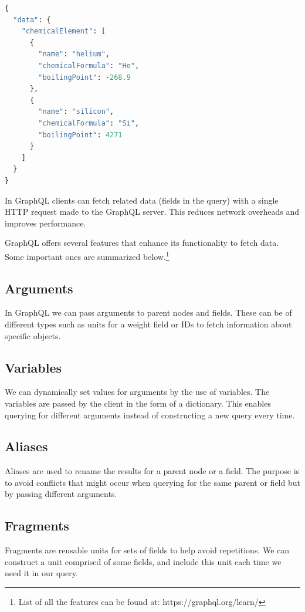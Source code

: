 \begin{minipage}{\linewidth}
\begin{lstlisting}[label=lst:6, caption={Results of the GraphQL query}, language=GraphQL]
{
  "data": {
    "chemicalElement": [
      {
        "name": "helium",
        "chemicalFormula": "He",
        "boilingPoint": -268.9
      },
      {
        "name": "silicon",
        "chemicalFormula": "Si",
        "boilingPoint": 4271
      }
    ]
  }
}
\end{lstlisting}
\end{minipage}

In GraphQL clients can fetch related data (fields in the query) with a single HTTP request made to the GraphQL server. This reduces network overheads and improves performance.

GraphQL offers several features that enhance its functionality to fetch data. Some important ones are summarized below.\footnote{List of all the features can be found at: https://graphql.org/learn/}

\subsection{Arguments}
In GraphQL we can pass arguments to parent nodes and fields. These can be of different types such as units for a weight field or IDs to fetch information about specific objects.

\subsection{Variables}
We can dynamically set values for arguments by the use of variables. The variables are passed by the client in the form of a dictionary. This enables querying for different arguments instead of constructing a new query every time.

\subsection{Aliases}
Aliases are used to rename the results for a parent node or a field. The purpose is to avoid conflicts that might occur when querying for the same parent or field but by passing different arguments.

\subsection{Fragments}
Fragments are reusable units for sets of fields to help avoid repetitions. We can construct a unit comprised of some fields, and include this unit each time we need it in our query.

